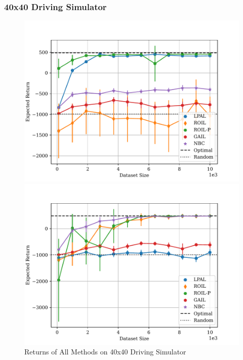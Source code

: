 \documentclass{beamer}
\begin{document}
\begin{frame}
	\frametitle{40x40 Driving Simulator}
\begin{figure}
  \begin{center}
  \begin{minipage}{0.45\linewidth}
    \centering
    \includegraphics[width=\linewidth]{plots/returns/40x40_driving_on_policy_returns.pdf}
  \end{minipage}
  \hspace{0.05\linewidth}
  \begin{minipage}{0.45\linewidth}
    \centering
    \includegraphics[width=\linewidth]{plots/returns/40x40_driving_off_policy_returns.pdf}
  \end{minipage}
  \end{center}
\caption{Returns of All Methods on 40x40 Driving Simulator}
\end{figure}
\end{frame}
\end{document}
